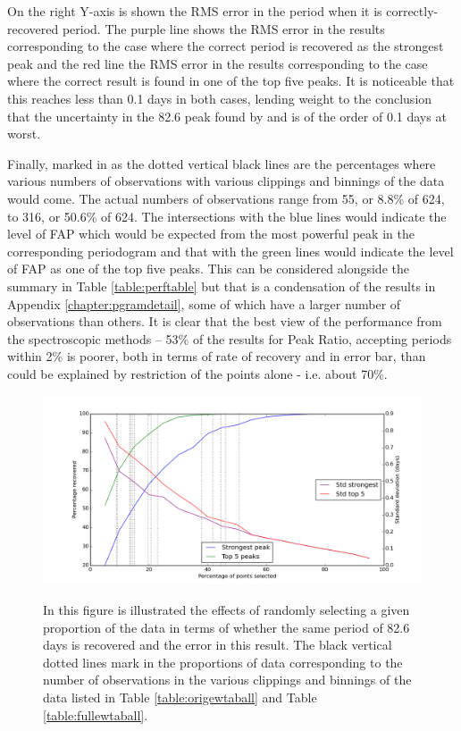 On the right Y-axis is shown the RMS error in the period when it is correctly-recovered period. The purple line shows
the RMS error in the results corresponding to the case where the correct period is recovered as the strongest peak and
the red line the RMS error in the results corresponding to the case where the correct result is found in one of the top
five peaks. It is noticeable that this reaches less than 0.1 days in both cases, lending weight to the conclusion that
the uncertainty in the 82.6 peak found by {\asas} and {\hst} is of the order of 0.1 days at worst.

Finally, marked in as the dotted vertical black lines are the percentages where various numbers of observations with
various clippings and binnings of the {\harps} data would come. The actual numbers of observations range from 55, or
8.8\% of 624, to 316, or 50.6\% of 624. The intersections with the blue lines would indicate the level of FAP which
would be expected from the most powerful peak in the corresponding periodogram and that with the green lines would
indicate the level of FAP as one of the top five peaks. This can be considered alongside the summary in Table
\ref{table:perftable} but that is a condensation of the results in Appendix \ref{chapter:pgramdetail}, some of which
have a larger number of observations than others. It is clear that the best view of the performance from the
spectroscopic methods -- 53\% of the results for Peak Ratio, accepting periods within 2\% is poorer, both in terms of
rate of recovery and in error bar, than could be explained by restriction of the points alone - i.e. about 70\%.

\begin{figure}[!htbp]
\begin{center}
\includegraphics[scale=0.4]{Figures/prop.png} \\
\end{center}   
\caption{In this figure is illustrated the effects of randomly selecting a given proportion of the {\asas} data in terms
  of whether the same period of 82.6 days is recovered and the error in this result. The black vertical dotted lines
  mark in the proportions of data corresponding to the number of observations in the various clippings and binnings of
  the data listed in Table \ref{table:origewtaball} and Table \ref{table:fullewtaball}.}
\protect\label{fig:asasprop}
\end{figure}
